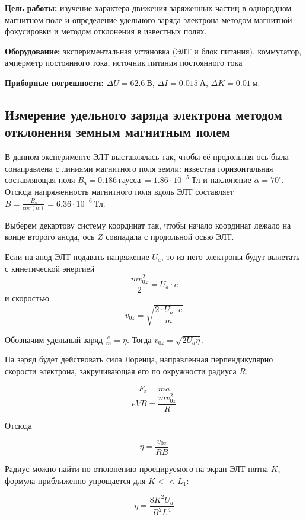 % 

\textbf{Цель работы:} изучение характера движения заряженных частиц в однородном магнитном поле и определение удельного заряда электрона методом магнитной фокусировки и методом отклонения в известных полях.

\textbf{Оборудование:}
экспериментальная установка (ЭЛТ и блок питания), коммутатор, амперметр постоянного тока, источник питания постоянного тока 

\textbf{Приборные погрешности:} $\Delta{U}=62.6\ \text{В}$, $\Delta{I}=0.015\ \text{А}$, $\Delta{K}=0.01\ \text{м}$. 

\subsection{Измерение удельного заряда электрона методом отклонения земным магнитным полем}

В данном эксперименте ЭЛТ выставлялась так, чтобы её продольная ось была сонаправлена с линиями магнитного поля земли: известна горизонтальная составляющая поля  $B_\text{з}=0.186\ \text{гаусса}\ =1.86\cdot10^{-5}\ \text{Тл}$ и наклонение $\alpha=70^{\circ}$. Отсюда напряженность магнитного поля вдоль ЭЛТ составляет $B=\frac{B_\text{з}}{cos(\alpha)}=6.36\cdot10^{-6}\ \text{Тл}$.

Выберем декартову систему координат так, чтобы начало координат лежало на конце второго анода, ось $Z$ совпадала с продольной осью ЭЛТ.

Если на анод ЭЛТ подавать напряжение $U_a$, то из него электроны будут вылетать с кинетической энергией 
$$\frac{mv_{0z}^2}{2}=U_a\cdot{}e$$
и скоростью
$$v_{0z}=\sqrt{\frac{2\cdot{}U_a\cdot{}e}{m}}$$

Обозначим удельный заряд $\frac{e}{m}=\eta$. Тогда $v_{0z}=\sqrt{2U_a\eta}$.

На заряд будет действовать сила Лоренца, направленная перпендикулярно скорости электрона, закручивающая его по окружности радиуса $R$.

$$F_\text{л}=ma$$
$$eVB=\frac{mv_{0z}^2}{R}$$

Отсюда

$$\eta=\frac{v_{0z}}{RB}$$

Радиус можно найти по отклонению проецируемого на экран ЭЛТ пятна $K$, формула приближенно упрощается для $K<<L_1$:

\begin{equation}
	\eta=\frac{8K^2U_a}{B^2L^4}	
	\label{eta1}
\end{equation}

